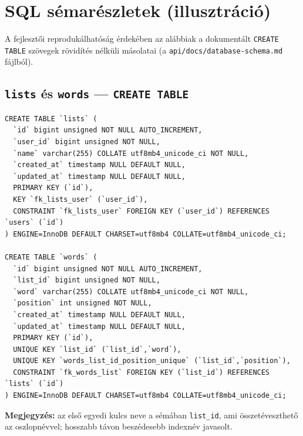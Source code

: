 \section{SQL sémarészletek (illusztráció)}
A fejlesztői reprodukálhatóság érdekében az alábbiak a dokumentált \texttt{CREATE TABLE} szövegek rövidítés nélküli másolatai (a \texttt{api/docs/database-schema.md} fájlból).

\subsection{\texttt{lists} és \texttt{words} — \texttt{CREATE TABLE}}
\begin{lstlisting}
CREATE TABLE `lists` (
  `id` bigint unsigned NOT NULL AUTO_INCREMENT,
  `user_id` bigint unsigned NOT NULL,
  `name` varchar(255) COLLATE utf8mb4_unicode_ci NOT NULL,
  `created_at` timestamp NULL DEFAULT NULL,
  `updated_at` timestamp NULL DEFAULT NULL,
  PRIMARY KEY (`id`),
  KEY `fk_lists_user` (`user_id`),
  CONSTRAINT `fk_lists_user` FOREIGN KEY (`user_id`) REFERENCES `users` (`id`)
) ENGINE=InnoDB DEFAULT CHARSET=utf8mb4 COLLATE=utf8mb4_unicode_ci;

CREATE TABLE `words` (
  `id` bigint unsigned NOT NULL AUTO_INCREMENT,
  `list_id` bigint unsigned NOT NULL,
  `word` varchar(255) COLLATE utf8mb4_unicode_ci NOT NULL,
  `position` int unsigned NOT NULL,
  `created_at` timestamp NULL DEFAULT NULL,
  `updated_at` timestamp NULL DEFAULT NULL,
  PRIMARY KEY (`id`),
  UNIQUE KEY `list_id` (`list_id`,`word`),
  UNIQUE KEY `words_list_id_position_unique` (`list_id`,`position`),
  CONSTRAINT `fk_words_list` FOREIGN KEY (`list_id`) REFERENCES `lists` (`id`)
) ENGINE=InnoDB DEFAULT CHARSET=utf8mb4 COLLATE=utf8mb4_unicode_ci;
\end{lstlisting}

\textbf{Megjegyzés:} az első egyedi kulcs neve a sémában \texttt{list\_id}, ami összetéveszthető az oszlopnévvel; hosszabb távon beszédesebb indexnév javasolt.
